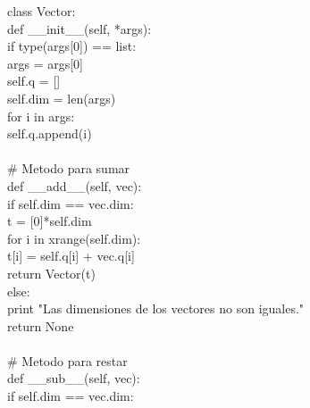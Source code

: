 \documentclass[10pt,letterpaper]{article}
\newenvironment{Code}
{
\begin{lrbox}{\selvestebox}%
\begin{minipage}{\dimexpr\columnwidth-2\fboxsep\relax}
\fontfamily{\ttdefault}\selectfont
}
{\end{minipage}\end{lrbox}%
\begin{center}
\colorbox{light-gray}{\usebox{\selvestebox}}
\end{center}
}
\begin{document}
\begin{scriptsize}
\begin{Code}
class Vector:\\
\hspace*{5mm} def \_\_init\_\_(self, *args):\\
\hspace*{11mm} if type(args[0]) == list:\\
\hspace*{17mm} args = args[0]\\
\hspace*{11mm} self.q = []\\
\hspace*{11mm} self.dim = len(args)\\
\hspace*{11mm} for i in args:\\
\hspace*{17mm} self.q.append(i)\\
\\
\hspace*{5mm} \# Metodo para sumar\\
\hspace*{5mm} def \_\_add\_\_(self, vec):\\
\hspace*{11mm} if self.dim == vec.dim:\\
\hspace*{17mm} t = [0]*self.dim\\
\hspace*{17mm} for i in xrange(self.dim):\\
\hspace*{23mm} t[i] = self.q[i] + vec.q[i]\\
\hspace*{17mm} return Vector(t)\\
\hspace*{11mm} else:\\
\hspace*{17mm} print "Las dimensiones de los vectores no son iguales."\\
\hspace*{17mm} return None\\
\\
\hspace*{5mm} \# Metodo para restar\\
\hspace*{5mm} def \_\_sub\_\_(self, vec):\\
\hspace*{11mm} if self.dim == vec.dim:\\

\end{Code}
\end{scriptsize}
\end{document}
